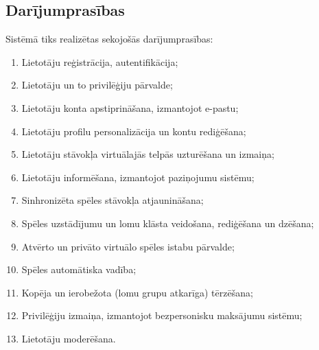 \subsection{Darījumprasības}

Sistēmā tiks realizētas sekojošās darījumprasības:
\begin{enumerate}
	\item Lietotāju reģistrācija, autentifikācija;
	\item Lietotāju un to privilēģiju pārvalde;
	\item Lietotāju konta apstiprināšana, izmantojot e-pastu;
	\item Lietotāju profilu personalizācija un kontu rediģēšana;
	\item Lietotāju stāvokļa virtuālajās telpās uzturēšana un izmaiņa;
	\item Lietotāju informēšana, izmantojot paziņojumu sistēmu;
	\item Sinhronizēta spēles stāvokļa atjaunināšana;
	\item Spēles uzstādījumu un lomu klāsta veidošana, rediģēšana un dzēšana;
	\item Atvērto un privāto virtuālo spēles istabu pārvalde;
	\item Spēles automātiska vadība;
	\item Kopēja un ierobežota (lomu grupu atkarīga) tērzēšana;
	\item Privilēģiju izmaiņa, izmantojot bezpersonisku maksājumu sistēmu;
	\item Lietotāju moderēšana.
\end{enumerate}
